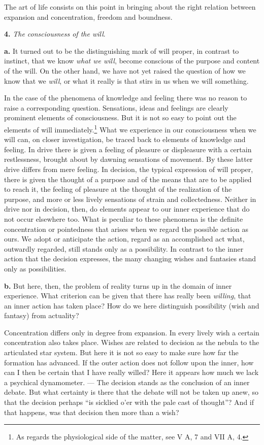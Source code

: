\documentclass[12pt,a4paper]{book}
\newcommand{\opage}[1]{\marginnote{\footnotesize\textit{[#1]}}}
\begin{document}
\opage{395}The art of life consists on this point in bringing about the
right relation between expansion and concentration, freedom and
boundness.

\textbf{4.} \emph{The consciousness of the will}.

\textbf{a.} It turned out to be the distinguishing mark of will proper, in
contrast to instinct, that we know \emph{what we will}, become conscious
of the purpose and content of the will. On the other hand, we have not
yet raised the question of how we know that we \emph{will}, or what it
really is that stirs in us when we will something.

In the case of the phenomena of knowledge and feeling there was no reason
to raise a corresponding question. Sensations, ideas and feelings are
clearly prominent elements of consciousness. But it is not so easy to
point out the elements of will immediately.\footnote{As regards the
physiological side of the matter, see V A, 7 and VII A, 4.} What we
experience in our consciousness when we will can, on closer
investigation, be traced back to elements of knowledge and feeling. In
drive there is given a feeling of pleasure or displeasure with a certain
restlessness, brought about by dawning sensations of movement. By these
latter drive differs from mere feeling. In decision, the typical
expression of will proper, there is given the thought of a purpose and of
the means that are to be applied to reach it, the feeling of pleasure at
the thought of the realization of the purpose, and more or less lively
sensations of strain and collectedness. Neither in drive nor in decision,
then, do elements appear to our inner experience that do not occur
elsewhere too. What is peculiar to these phenomena is the definite
concentration or pointedness that arises when we regard the possible
action as ours. We adopt or anticipate the action, regard as an
accomplished act what, outwardly regarded, still stands only as a
possibility. In contrast to the inner action that the decision expresses,
the many changing wishes and fantasies stand only as possibilities.

\opage{396}\textbf{b.} But here, then, the problem of reality turns up in
the domain of inner experience. What criterion can be given that there
has really been \emph{willing}, that an inner action has taken place? How
do we here distinguish possibility (wish and fantasy) from actuality?

Concentration differs only in degree from expansion. In every lively wish
a certain concentration also takes place. Wishes are related to decision
as the nebula to the articulated star system. But here it is not so easy
to make sure how far the formation has advanced. If the outer action does
not follow upon the inner, how can I then be certain that I have really
willed? Here it appears how much we lack a psychical dynamometer. --- The
decision stands as the conclusion of an inner debate. But what certainty
is there that the debate will not be taken up anew, so that the decision
perhaps ``is sicklied o'er with the pale cast of thought''? And if that
happens, was that decision then more than a wish?
\end{document}

